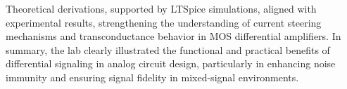 Theoretical derivations, supported by LTSpice simulations, aligned with experimental results, strengthening the understanding of current steering mechanisms and transconductance behavior in MOS differential amplifiers. In summary, the lab clearly illustrated the functional and practical benefits of differential signaling in analog circuit design, particularly in enhancing noise immunity and ensuring signal fidelity in mixed-signal environments.

\clearpage
\printbibliography[heading=subbibliography]